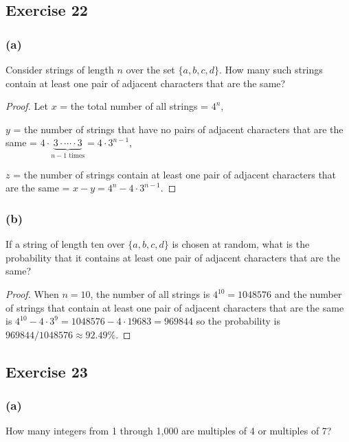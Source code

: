 \documentclass[14pt]{extarticle}
\begin{document}
\subsection{Exercise 22}
\subsubsection{(a)}
Consider strings of length $n$ over the set \(\{a, b, c, d\}\). How many such strings contain at least one pair of 
adjacent characters that are the same?

\begin{proof}
Let $x$ = the total number of all strings = \(4^n\), 

$y$ = the number of strings that have no pairs of adjacent 
characters that are the same = \(4 \cdot \underbrace{3 \cdot \cdots \cdot 3}_{n-1 \text{ times}} = 4 \cdot 3^{n-1}\),

$z$ = the number of strings contain at least one pair of 
adjacent characters that are the same = \(x - y = 4^n - 4 
\cdot 3^{n-1}\).
\end{proof}

\subsubsection{(b)}
If a string of length ten over \(\{a, b, c, d\}\) is chosen at random, what is the probability that it contains at 
least one pair of adjacent characters that are the same?

\begin{proof}
When $n=10$, the number of all strings is \(4^{10} = 1048576\) and the number of strings that contain at least 
one pair of adjacent characters that are the same is \(4^{10} - 4 \cdot 3^9 = 1048576 - 4 \cdot 19683 = 969844\)
so the probability is \(969844 / 1048576 \approx 92.49\%\).
\end{proof}

\subsection{Exercise 23}
\subsubsection{(a)}
How many integers from 1 through 1,000 are multiples of 4 or multiples of 7?
\end{document}
